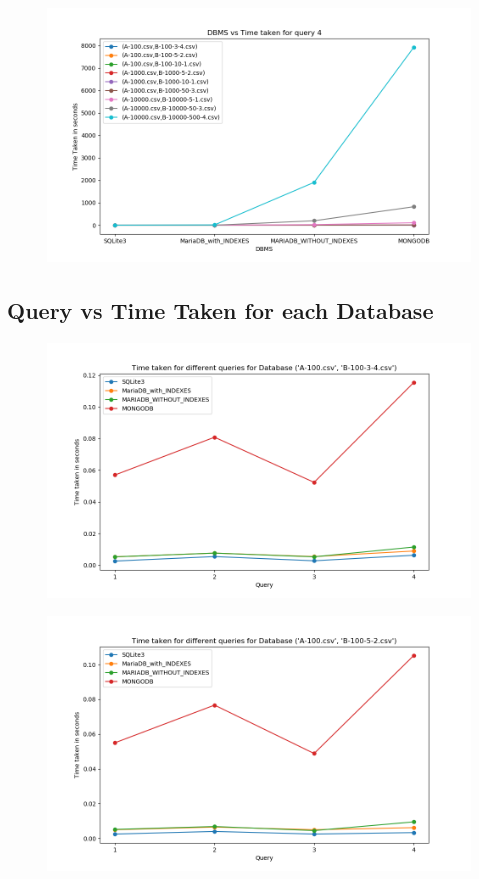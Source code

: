 \documentclass[12pt]{article}
\begin{document}
\begin{figure}[H]
  \centering
  \includegraphics[width=.95\linewidth]{dbms_time/4.png}
\end{figure}


\subsection{Query vs Time Taken for each Database}

\begin{figure}[H]
  \centering
  \includegraphics[width=.95\linewidth]{db_qry_time/1.png}
\end{figure}

\begin{figure}[H]
  \centering
  \includegraphics[width=.95\linewidth]{db_qry_time/2.png}
\end{figure}
\end{document}
